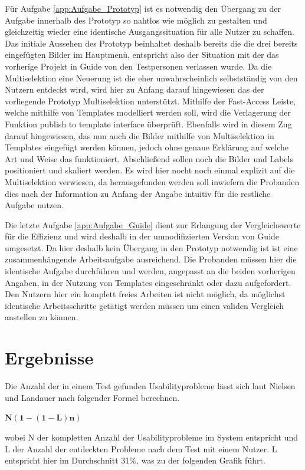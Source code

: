 Für Aufgabe \ref{app:Aufgabe_Prototyp} ist es notwendig den Übergang zu der Aufgabe innerhalb des Prototyp so nahtlos wie möglich zu gestalten und gleichzeitig wieder eine identische Ausgangssituation für alle Nutzer zu schaffen.
Das initiale Aussehen des Prototyp beinhaltet deshalb bereits die die drei bereits eingefügten Bilder im Hauptmenü, entspricht also der Situation mit der das vorherige Projekt in Guide von den Testpersonen verlassen wurde.
Da die Multiselektion eine Neuerung ist die eher unwahrscheinlich selbstständig von den Nutzern entdeckt wird, wird hier zu Anfang darauf hingewiesen das der vorliegende Prototyp Multiselektion unterstützt.
Mithilfe der Fast-Access Leiste, welche mithilfe von Templates modelliert werden soll, wird die Verlagerung der Funktion \glqq publish to template interface\grqq{} überprüft.
Ebenfalls wird in diesem Zug darauf hingewiesen, das nun auch die Bilder mithilfe von Multiselektion in Templates eingefügt werden können, jedoch ohne genaue Erklärung auf welche Art und Weise das funktioniert.
Abschließend sollen noch die Bilder und Labels positioniert und skaliert werden.
Es wird hier nocht noch einmal explizit auf die Multiselektion verwiesen, da herausgefunden werden soll inwiefern die Probanden dies nach der Information zu Anfang der Angabe intuitiv für die restliche Aufgabe nutzen.

Die letzte Aufgabe \ref{app:Aufgabe_Guide} dient zur Erlangung der Vergleichswerte für die Effizienz und wird deshalb in der unmodifizierten Version von Guide umgesetzt.
Da hier deshalb kein Übergang in den Prototyp notwendig ist ist eine zusammenhängende Arbeitsaufgabe ausreichend.
Die Probanden müssen hier die identische Aufgabe durchführen und werden, angepasst an die beiden vorherigen Angaben, in der Nutzung von Templates eingeschränkt oder dazu aufgefordert.
Den Nutzern hier ein komplett freies Arbeiten ist nicht möglich, da möglichst identische Arbeitsschritte getätigt werden müssen um einen validen Vergleich anstellen zu können.

\section {Ergebnisse}
Die Anzahl der in einem Test gefunden Usabilityprobleme lässt sich laut Nielsen und Landauer nach folgender Formel berechnen.

\begin{center}
$\mathbf{N (1-(1- L ) n )}$ 
\end{center}

wobei N der kompletten Anzahl der Usabilityprobleme im System entspricht und L der Anzahl der entdeckten Probleme nach dem Test mit einem Nutzer.
L entspricht hier im Durchschnitt 31\%, was zu der folgenden Grafik führt.  \cite{Nielsen.1993}

